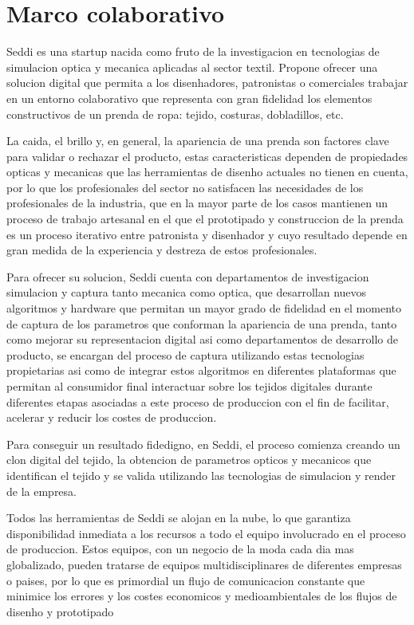 \chapter{Marco colaborativo}
Seddi es una startup nacida como fruto de la investigacion en tecnologias de simulacion optica y mecanica aplicadas al sector textil.
Propone ofrecer una solucion digital que permita a los disenhadores, patronistas o comerciales trabajar en un entorno colaborativo que
representa con gran fidelidad los elementos constructivos de un prenda de ropa: tejido, costuras, dobladillos, etc.

La caida, el brillo y, en general, la apariencia de una prenda son factores clave para validar o rechazar el producto, estas caracteristicas
dependen de propiedades opticas y mecanicas que las herramientas de disenho actuales no tienen en cuenta, por lo que los profesionales del
sector no satisfacen las necesidades de los profesionales de la industria, que en la mayor parte de los casos mantienen un proceso de
trabajo artesanal en el que el prototipado y construccion de la prenda es un proceso iterativo entre patronista y disenhador y cuyo
resultado depende en gran medida de la experiencia y destreza de estos profesionales.

Para ofrecer su solucion, Seddi cuenta con departamentos de investigacion simulacion y captura tanto mecanica como optica, que desarrollan
nuevos algoritmos y hardware que permitan un mayor grado de fidelidad en el momento de captura de los parametros que conforman la apariencia
de una prenda, tanto como mejorar su representacion digital asi como departamentos de desarrollo de producto, se encargan del proceso de
captura utilizando estas tecnologias propietarias asi como de integrar estos algoritmos en diferentes plataformas que permitan al consumidor
final interactuar sobre los tejidos digitales durante diferentes etapas asociadas a este proceso de produccion con el fin de facilitar,
acelerar y reducir los costes de produccion.

Para conseguir un resultado fidedigno, en Seddi, el proceso comienza creando un clon digital del tejido, la obtencion de parametros opticos y
mecanicos que identifican el tejido y se valida utilizando las tecnologias de simulacion y render de la empresa. 

Todos las herramientas de Seddi se alojan en la nube, lo que garantiza disponibilidad inmediata a los recursos a todo el equipo involucrado en
el proceso de produccion. Estos equipos, con un negocio de la moda cada dia mas globalizado, pueden tratarse de equipos multidisciplinares de
diferentes empresas o paises, por lo que es primordial un flujo de comunicacion constante que minimice los errores y los costes economicos y
medioambientales de los flujos de disenho y prototipado

